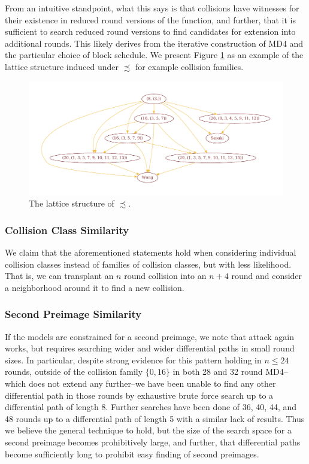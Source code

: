 \documentclass[conference]{IEEEtran}
\begin{document}
From an intuitive standpoint, what this says is that collisions have
witnesses for their existence in reduced round versions of the function, and
further, that it is sufficient to search reduced round versions to find
candidates for extension into additional rounds. This likely derives from
the iterative construction of MD4 and the particular choice of block schedule.
We present Figure \ref{Fig:PrecSim} as an example of the lattice structure
induced under $\precsim$ for example collision families.


\begin{figure}
\begin{center}
\includegraphics[width=\textwidth]{Figs/lattice.pdf}
\caption{The lattice structure of $\precsim$.}
\label{Fig:PrecSim}
\end{center}
\end{figure}




\subsubsection{Collision Class Similarity}

We claim that the aforementioned statements hold when considering individual
collision classes instead of families of collision classes, but with less
likelihood. That is, we can transplant an $n$ round collision into an $n+4$
round and consider a neighborhood around it to find a new collision.

\subsubsection{Second Preimage Similarity}

If the models are constrained for a second preimage, we note that attack again
works, but requires searching wider and wider differential paths in small round
sizes. In particular, despite strong evidence for this pattern holding in
$n \leq 24$ rounds, outside of the collision family $\{0, 16\}$ in both 28 and
32 round MD4--which does not extend any further--we have been unable to find
any other differential path in those rounds by exhaustive brute force search
up to a differential path of length 8. Further searches have been done of
36, 40, 44, and 48 rounds up to a differential path of length 5 with a similar
lack of results. Thus we believe the general technique to hold, but the size
of the search space for a second preimage becomes prohibitively large, and
further, that differential paths become sufficiently long to prohibit easy
finding of second preimages.
\end{document}
